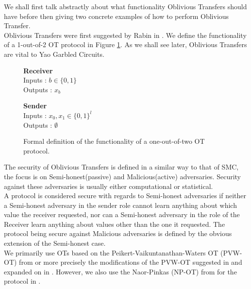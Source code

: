\documentclass[ %
                    author={Nicholas Tutte},
                supervisor={Prof. Nigel Smart},
                    degree={MEng},
                     title={Secure Two Party Computation},
                  subtitle={A practical comparison of recent protocols},
                      type={Research - GG1K},
                      year={2015} ]{dissertation}
\begin{document}
			We shall first talk abstractly about what functionality Oblivious Transfers should have before then giving two concrete examples of how to perform Oblivious Transfer.\\

			Oblivious Transfers were first suggested by Rabin in \cite{Rabin81}. We define the functionality of a 1-out-of-2 OT protocol in Figure \ref{fig:OTformalDef}. As we shall see later, Oblivious Transfers are vital to Yao Garbled Circuits. 

			\begin{figure}[!htb]
				\centering
				\begin{minipage}{0.45\textwidth}
					\centering
					\textbf{Receiver}\\
					Inputs : $b \in \{0, 1\}$\\
					Outputs : $x_b$\\
				\end{minipage}
				\begin{minipage}{0.45\textwidth}
					\centering
					\textbf{Sender}\\
					Inputs : $x_0, x_1 \in \{0, 1\}^l$\\
					Outputs : $\emptyset$\\
				\end{minipage}

				\caption{ Formal definition of the functionality of a one-out-of-two OT protocol.\label{fig:OTformalDef}}
			\end{figure}

			The security of Oblivious Transfers is defined in a similar way to that of SMC, the focus is on Semi-honest(passive) and Malicious(active) adversaries. Security against these adversaries is usually either computational or statistical.\\

			A protocol is considered secure with regards to Semi-honest adversaries if neither a Semi-honest adversary in the sender role cannot learn anything about which value the receiver requested, nor can a Semi-honest adversary in the role of the Receiver learn anything about values other than the one it requested. The protocol being secure against Malicious adversaries is defined by the obvious extension of the Semi-honest case.\\

			We primarily use OTs based on the Peikert-Vaikuntanathan-Waters OT (PVW-OT) from \cite{PVW_OT_2008} or more precisely the modifications of the PVW-OT suggested in \cite{LindellAndPinkas2011} and expanded on in \cite{Lindell_CnC_2013}. However, we also use the Naor-Pinkas (NP-OT) from \cite{NaorPinkasOT2001} for the protocol in \cite{Katz_Symm_CnC_2013}.
\end{document}
